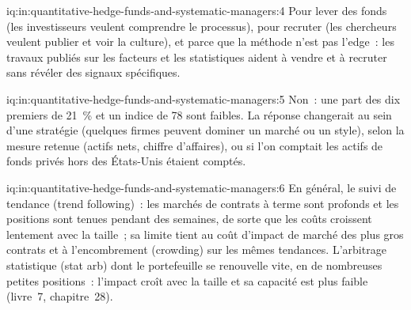 \begin{solution}{iq:in:quantitative-hedge-funds-and-systematic-managers:4}
Pour lever des fonds (les investisseurs veulent comprendre le processus), pour recruter (les chercheurs veulent publier et voir la
culture), et parce que la méthode n'est pas l'edge~: les travaux publiés sur les facteurs et les statistiques aident à vendre et à recruter sans
révéler des signaux spécifiques.
\end{solution}

\begin{solution}{iq:in:quantitative-hedge-funds-and-systematic-managers:5}
Non~: une part des dix premiers de 21~\% et un indice de 78 sont faibles. La réponse changerait au sein d'une stratégie (quelques firmes peuvent
dominer un marché ou un style), selon la mesure retenue (actifs nets, chiffre d'affaires), ou si l'on comptait les actifs de fonds privés hors des
États-Unis étaient comptés.
\end{solution}

\begin{solution}{iq:in:quantitative-hedge-funds-and-systematic-managers:6}
En général, le suivi de tendance (trend following)~: les marchés de contrats à terme sont profonds et les positions sont tenues pendant des semaines, de sorte que les coûts croissent lentement avec la taille~;
sa limite tient au coût d'impact de marché des plus gros contrats et à l'encombrement (crowding) sur les mêmes tendances. L'arbitrage statistique (stat arb)
dont le portefeuille se renouvelle vite, en de nombreuses petites positions~: l'impact croît avec la taille et sa capacité est plus faible (livre~7, chapitre~28).
\end{solution}
